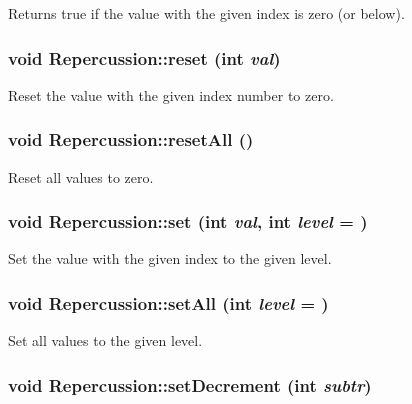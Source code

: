 \label{classRepercussion_a95fc77c0adf534f0ce92a48a23bdaece}
Returns true if the value with the given index is zero (or below). \hypertarget{classRepercussion_a5677645d06730a42d44b2b69e6e1cac2}{
\subsubsection[{reset}]{\setlength{\rightskip}{0pt plus 5cm}void Repercussion::reset (int {\em val})}}
\label{classRepercussion_a5677645d06730a42d44b2b69e6e1cac2}
Reset the value with the given index number to zero. \hypertarget{classRepercussion_ad119f81fef26097425bed1cad45dcaa9}{
\subsubsection[{resetAll}]{\setlength{\rightskip}{0pt plus 5cm}void Repercussion::resetAll ()}}
\label{classRepercussion_ad119f81fef26097425bed1cad45dcaa9}
Reset all values to zero. \hypertarget{classRepercussion_a27ded768fd7b386d8530dae787c46911}{
\subsubsection[{set}]{\setlength{\rightskip}{0pt plus 5cm}void Repercussion::set (int {\em val}, \/  int {\em level} = {})}}
\label{classRepercussion_a27ded768fd7b386d8530dae787c46911}
Set the value with the given index to the given level. \hypertarget{classRepercussion_ad825c06913e11c2617f38ee4421f237a}{
\subsubsection[{setAll}]{\setlength{\rightskip}{0pt plus 5cm}void Repercussion::setAll (int {\em level} = {})}}
\label{classRepercussion_ad825c06913e11c2617f38ee4421f237a}
Set all values to the given level. \hypertarget{classRepercussion_a66219691fbf748e8751cf1c447347683}{
\subsubsection[{setDecrement}]{\setlength{\rightskip}{0pt plus 5cm}void Repercussion::setDecrement (int {\em subtr})}}
